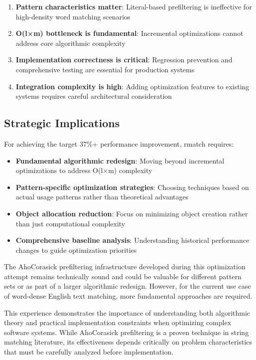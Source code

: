 \documentclass[11pt,a4paper]{article}
\begin{document}
\begin{enumerate}
\item \textbf{Pattern characteristics matter}: Literal-based prefiltering is ineffective for high-density word matching scenarios
\item \textbf{O(l×m) bottleneck is fundamental}: Incremental optimizations cannot address core algorithmic complexity
\item \textbf{Implementation correctness is critical}: Regression prevention and comprehensive testing are essential for production systems
\item \textbf{Integration complexity is high}: Adding optimization features to existing systems requires careful architectural consideration
\end{enumerate}

\subsection{Strategic Implications}

For achieving the target 37\%+ performance improvement, rmatch requires:

\begin{itemize}
\item \textbf{Fundamental algorithmic redesign}: Moving beyond incremental optimizations to address O(l×m) complexity
\item \textbf{Pattern-specific optimization strategies}: Choosing techniques based on actual usage patterns rather than theoretical advantages
\item \textbf{Object allocation reduction}: Focus on minimizing object creation rather than just computational complexity
\item \textbf{Comprehensive baseline analysis}: Understanding historical performance changes to guide optimization priorities
\end{itemize}

The AhoCorasick prefiltering infrastructure developed during this optimization attempt remains technically sound and could be valuable for different pattern sets or as part of a larger algorithmic redesign. However, for the current use case of word-dense English text matching, more fundamental approaches are required.

This experience demonstrates the importance of understanding both algorithmic theory and practical implementation constraints when optimizing complex software systems. While AhoCorasick prefiltering is a proven technique in string matching literature, its effectiveness depends critically on problem characteristics that must be carefully analyzed before implementation.

% 
% 
\end{document}
